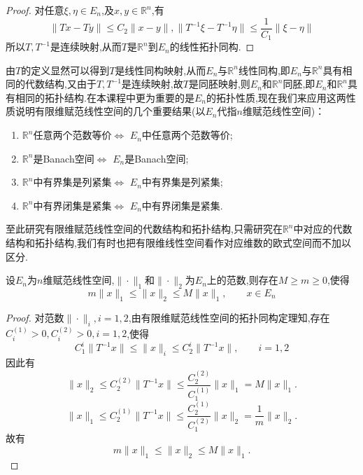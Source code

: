 \documentclass[lang=cn,18pt]{elegantbook}
\begin{document}
\begin{proof}
    对任意$\xi,\eta \in E_n$,及$x,y \in \mathbb{R}^n$,有
    $$\|Tx-Ty\|\leqslant C_2\|x-y\|,\|T^{-1}\xi -T^{-1}\eta\|\leqslant \frac{1}{C_1}\|\xi -\eta \|$$
    所以$T,T^{-1}$是连续映射,从而$T$是$\mathbb{R}^n$到$E_n$的线性拓扑同构.
    \end{proof}

\begin{note}
    由$T$的定义显然可以得到$T$是线性同构映射,从而$E_n$与$\mathbb{R}^n$线性同构,即$E_n$与$\mathbb{R}^n$具有相同的代数结构,又由于$T,T^{-1}$是连续映射,故$T$是同胚映射,则$E_n$和$\mathbb{R}^n$同胚,即$E_n$和$\mathbb{R}^n$具有相同的拓扑结构.在本课程中更为重要的是$E_n$的拓扑性质,现在我们来应用这两性质说明有限维赋范线性空间的几个重要结果(以$E_n$代指$n$维赋范线性空间)：
    \begin{enumerate}
        \item $\mathbb{R}^n$任意两个范数等价$\Longleftrightarrow $ $E_n$中任意两个范数等价;
        \item $\mathbb{R}^n$是Banach空间$\Longleftrightarrow $ $E_n$是Banach空间;
        \item $\mathbb{R}^n$中有界集是列紧集$\Longleftrightarrow$ $E_n$中有界集是列紧集;
        \item $\mathbb{R}^n$中有界闭集是紧集$\Longleftrightarrow$ $E_n$中有界闭集是紧集.
    \end{enumerate}
    至此研究有限维赋范线性空间的代数结构和拓扑结构,只需研究在$\mathbb{R}^n$中对应的代数结构和拓扑结构,我们有时也把有限维线性空间看作对应维数的欧式空间而不加以区分.
\end{note}

\begin{theorem}{\textreferencemark}
    设$E_n$为$n$维赋范线性空间,$\|\cdot\|_1$和$\|\cdot \|_2$为$E_n$上的范数,则存在$M \geqslant m \geqslant 0$,使得
    $$m\|x\|_1 \leqslant \|x\|_2 \leqslant M\|x \|_1, \quad\quad x\in E_n$$
\end{theorem}
\begin{proof}
    对范数$\| \cdot \|_i,i=1,2$,由有限维赋范线性空间的拓扑同构定理知,存在$C^{(1)}_{i} > 0,C^{(2)}_{i} >0,i=1,2$,使得
    $$C^{i}_{1}\|T^{-1}x \| \leqslant \|x\|_i \leqslant C^{i}_{2}\|T^{-1}x\|,\quad\quad i=1,2$$
    因此有
    $$\|x\|_2 \leqslant C_2^{(2)} \|T^{-1}x\| \leqslant \frac{C^{(2)}_2}{C^{(1)}_1}\|x\|_1 = M \|x \|_1.$$
    $$\|x\|_1 \leqslant C_2^{(1)} \|T^{-1}x\| \leqslant \frac{C^{(1)}_2}{C^{(2)}_1}\|x\|_2 = \frac{1}{m} \|x \|_2.$$
    故有
    $$m\|x\|_1 \leqslant \|x\|_2 \leqslant M\|x \|_1.$$
\end{proof}
\end{document}
